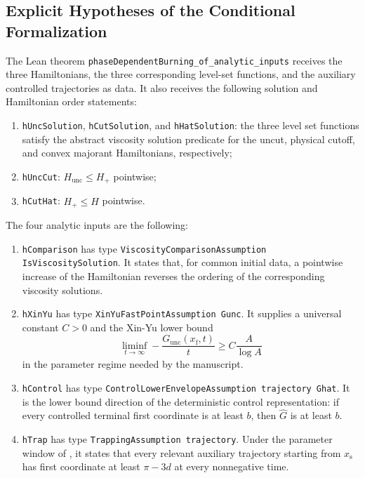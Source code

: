 \documentclass[11pt,reqno,noamsfonts]{amsart}
\theoremstyle{definition}
\theoremstyle{remark}
\begin{document}
\subsection{Explicit Hypotheses of the Conditional Formalization}

The Lean theorem
\texttt{phaseDependentBurning\_of\_analytic\_inputs} receives the three
Hamiltonians, the three corresponding level-set functions, and the
auxiliary controlled trajectories as data. It also receives the
following solution and Hamiltonian order statements:
\begin{enumerate}[label=\textbf{(S\arabic*)}]
\item \texttt{hUncSolution}, \texttt{hCutSolution}, and
  \texttt{hHatSolution}: the three level set functions satisfy the
  abstract viscosity solution predicate for the uncut, physical cutoff,
  and convex majorant Hamiltonians, respectively;
\item \texttt{hUncCut}: \(H_{\mathrm{unc}}\le H_{+}\) pointwise;
\item \texttt{hCutHat}: \(H_{+}\le\widehat H\) pointwise.
\end{enumerate}

The four analytic inputs are the
following:
\begin{enumerate}[label=\textbf{(A\arabic*)}]
\item \texttt{hComparison} has type
  \texttt{ViscosityComparisonAssumption IsViscositySolution}. It states
  that, for common initial data, a pointwise increase of the Hamiltonian
  reverses the ordering of the corresponding viscosity solutions.

\item \texttt{hXinYu} has type
  \texttt{XinYuFastPointAssumption Gunc}. It supplies a universal
  constant \(C>0\) and the Xin-Yu lower bound
  \[
    \liminf_{t\to\infty}
    -\frac{G_{\mathrm{unc}}(x_{\mathrm f},t)}{t}
    \ge C\frac{A}{\log A}
  \]
  in the parameter regime needed by the manuscript.

\item \texttt{hControl} has type
  \texttt{ControlLowerEnvelopeAssumption trajectory Ghat}. It is the
  lower bound direction of the deterministic control representation:
  if every controlled terminal first coordinate is at least \(b\), then
  \(\widehat G\) is at least \(b\).

\item \texttt{hTrap} has type
  \texttt{TrappingAssumption trajectory}. Under the parameter window
  of , it states that every relevant auxiliary trajectory
  starting from \(x_{\mathrm s}\) has first coordinate at least
  \(\pi-3d\) at every nonnegative time.
\end{enumerate}
\end{document}
